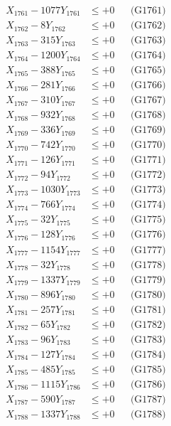 \documentclass[a4paper,10pt]{article}
\begin{document}
{\begin{align}
\allowbreak
X_{1761} - 1077Y_{1761} &\leq +0 && \text{(G1761)} \\
X_{1762} - 8Y_{1762} &\leq +0 && \text{(G1762)} \\
X_{1763} - 315Y_{1763} &\leq +0 && \text{(G1763)} \\
X_{1764} - 1200Y_{1764} &\leq +0 && \text{(G1764)} \\
X_{1765} - 388Y_{1765} &\leq +0 && \text{(G1765)} \\
X_{1766} - 281Y_{1766} &\leq +0 && \text{(G1766)} \\
X_{1767} - 310Y_{1767} &\leq +0 && \text{(G1767)} \\
X_{1768} - 932Y_{1768} &\leq +0 && \text{(G1768)} \\
X_{1769} - 336Y_{1769} &\leq +0 && \text{(G1769)} \\
X_{1770} - 742Y_{1770} &\leq +0 && \text{(G1770)} \\
\allowbreak
X_{1771} - 126Y_{1771} &\leq +0 && \text{(G1771)} \\
X_{1772} - 94Y_{1772} &\leq +0 && \text{(G1772)} \\
X_{1773} - 1030Y_{1773} &\leq +0 && \text{(G1773)} \\
X_{1774} - 766Y_{1774} &\leq +0 && \text{(G1774)} \\
X_{1775} - 32Y_{1775} &\leq +0 && \text{(G1775)} \\
X_{1776} - 128Y_{1776} &\leq +0 && \text{(G1776)} \\
X_{1777} - 1154Y_{1777} &\leq +0 && \text{(G1777)} \\
X_{1778} - 32Y_{1778} &\leq +0 && \text{(G1778)} \\
X_{1779} - 1337Y_{1779} &\leq +0 && \text{(G1779)} \\
X_{1780} - 896Y_{1780} &\leq +0 && \text{(G1780)} \\
\allowbreak
X_{1781} - 257Y_{1781} &\leq +0 && \text{(G1781)} \\
X_{1782} - 65Y_{1782} &\leq +0 && \text{(G1782)} \\
X_{1783} - 96Y_{1783} &\leq +0 && \text{(G1783)} \\
X_{1784} - 127Y_{1784} &\leq +0 && \text{(G1784)} \\
X_{1785} - 485Y_{1785} &\leq +0 && \text{(G1785)} \\
X_{1786} - 1115Y_{1786} &\leq +0 && \text{(G1786)} \\
X_{1787} - 590Y_{1787} &\leq +0 && \text{(G1787)} \\
X_{1788} - 1337Y_{1788} &\leq +0 && \text{(G1788)} \\

\end{align}}
\end{document}
